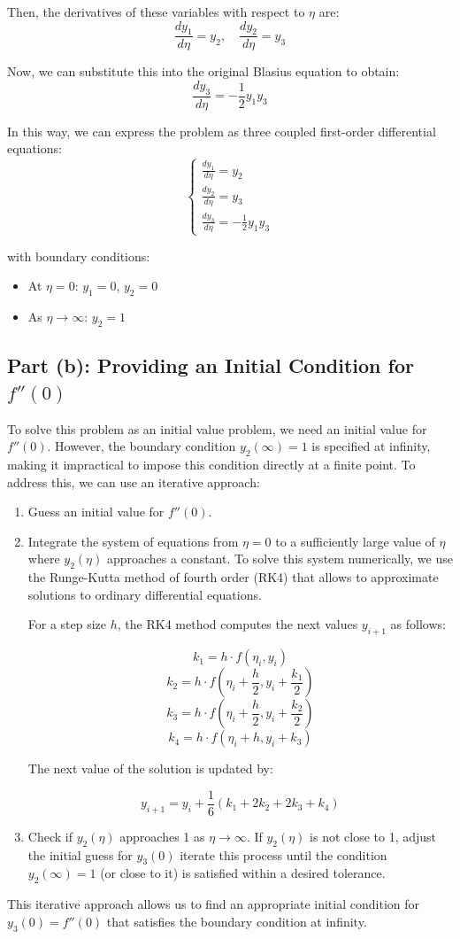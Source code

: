 \documentclass{article}
\begin{document}
Then, the derivatives of these variables with respect to \(\eta\) are:
\[
\frac{dy_1}{d\eta} = y_2, \quad \frac{dy_2}{d\eta} = y_3
\]

Now, we can substitute this into the original Blasius equation to obtain:
\[
\frac{dy_3}{d\eta} = -\frac{1}{2} y_1 y_3
\]

In this way, we can express the problem as three coupled first-order differential equations:
\[
\begin{cases}
\frac{dy_1}{d\eta} = y_2 \\
\frac{dy_2}{d\eta} = y_3 \\
\frac{dy_3}{d\eta} = -\frac{1}{2} y_1 y_3
\end{cases}
\]

with boundary conditions:
\begin{itemize}
    \item At \( \eta = 0 \): \( y_1 = 0 \), \( y_2 = 0 \)
    \item As \( \eta \to \infty \): \( y_2 = 1 \)
\end{itemize}

\subsection*{Part (b): Providing an Initial Condition for \( f''(0)\)}

To solve this problem as an initial value problem, we need an initial value for \( f''(0) \). However, the boundary condition \( y_2(\infty) = 1 \) is 
specified at infinity, making it impractical to impose this condition directly at a finite point. To address this, we can use an iterative approach:

\begin{enumerate}
    \item Guess an initial value for \( f''(0) \).
    \item Integrate the system of equations from \( \eta = 0 \) to a sufficiently large value of \( \eta \)  where \( y_2(\eta) \) approaches a constant. 
    To solve this system numerically, we use the Runge-Kutta method of fourth order (RK4) that allows to approximate solutions to ordinary differential equations.
    
    For a step size \( h \), the RK4 method computes the next values \( y_{i+1} \) as follows:
    
    \[
    k_1 = h \cdot f(\eta_i, y_i)
    \]
    \[
    k_2 = h \cdot f\left(\eta_i + \frac{h}{2}, y_i + \frac{k_1}{2}\right)
    \]
    \[
    k_3 = h \cdot f\left(\eta_i + \frac{h}{2}, y_i + \frac{k_2}{2}\right)
    \]
    \[
    k_4 = h \cdot f(\eta_i + h, y_i + k_3)
    \]
    
    The next value of the solution is updated by:
    
    \[
    y_{i+1} = y_i + \frac{1}{6} \left(k_1 + 2k_2 + 2k_3 + k_4\right)
    \]

    \item Check if \( y_2(\eta) \) approaches 1 as \( \eta \to \infty \). If \( y_2(\eta) \) is not close to 1, adjust the initial guess for \( y_3(0) \) 
    iterate this process until the condition \( y_2(\infty) = 1 \) (or close to it) is satisfied within a desired tolerance.
\end{enumerate}

This iterative approach allows us to find an appropriate initial condition for \( y_3(0) = f''(0) \) that satisfies the boundary condition at infinity.
\end{document}

